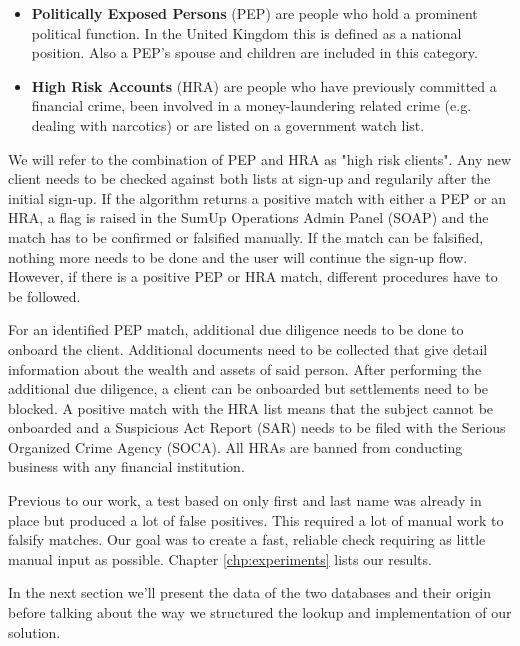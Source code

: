\documentclass[a4paper, oneside]{csthesis}
\begin{document}
\begin{itemize}
\item \textbf{Politically Exposed Persons} (PEP) are people who hold a prominent political function. In the United Kingdom this is defined as a national position. Also a PEP's spouse and children are included in this category.

\item \textbf{High Risk Accounts} (HRA) are people who have previously committed a financial crime, been involved in a money-laundering related crime (e.g. dealing with narcotics) or are listed on a government watch list.

\end{itemize}

We will refer to the combination of PEP and HRA as "high risk clients". Any new client needs to be checked against both lists at sign-up and regularily after the initial sign-up.
If the algorithm returns a positive match with either a PEP or an HRA, a flag is raised in the SumUp Operations Admin Panel (SOAP) and the match has to be confirmed or falsified manually. If the match can be falsified, nothing more needs to be done and the user will continue the sign-up flow. However, if there is a positive PEP or HRA match, different procedures have to be followed.

For an identified PEP match, additional due diligence needs to be done to onboard the client. Additional documents need to be collected that give detail information about the wealth and assets of said person. After performing the additional due diligence, a client can be onboarded but settlements need to be blocked.
A positive match with the HRA list means that the subject cannot be onboarded and a Suspicious Act Report (SAR) needs to be filed with the Serious Organized Crime Agency (SOCA). All HRAs are banned from conducting business with any financial institution.

Previous to our work, a test based on only first and last name was already in place but produced a lot of false positives. This required a lot of manual work to falsify matches. Our goal was to create a fast, reliable check requiring as little manual input as possible. Chapter \ref{chp:experiments} lists our results.

In the next section we'll present the data of the two databases and their origin before talking about the way we structured the lookup and implementation of our solution.

\end{document}
